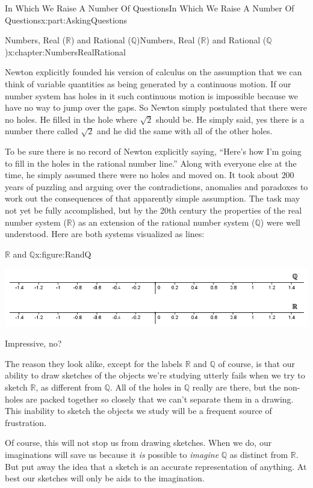 \documentclass[oneside,10pt,]{book}
\numberwithin{equation}{section}
\newcommand{\RR}{\mathbb {R}}
\newcommand{\QQ}{\mathbb {Q}}
\begin{document}
\begin{partptx}{In Which We Raise A Number Of Questions}{}{In Which We Raise A Number Of Questions}{}{}{x:part:AskingQuestions}
\begin{chapterptx}{Numbers, Real (\(\RR\)) and Rational (\(\QQ\))}{}{Numbers, Real (\(\RR\)) and Rational (\(\QQ\))}{}{}{x:chapter:NumbersRealRational}
\begin{introduction}{}
\par
Newton explicitly founded his version of calculus on the assumption that we can think of variable quantities as being generated by a continuous motion. If our number system has holes in it such continuous motion is impossible because we have no way to jump over the gaps. So Newton simply postulated that there were no holes. He filled in the hole where \(\sqrt{2}\) should be. He simply said, yes there is a number there called \(\sqrt{2}\) and he did the same with all of the other holes.%
\par
To be sure there is no record of Newton explicitly saying, ``Here's how I'm going to fill in the holes in the rational number line.'' Along with everyone else at the time, he simply assumed there were no holes and moved on. It took about \(200\) years of puzzling and arguing over the contradictions, anomalies and paradoxes to work out the consequences of that apparently simple assumption. The task may not yet be fully accomplished, but by the 20th century the properties of the real number system (\(\RR\)) as an extension of the rational number system (\(\QQ\)) were well understood. Here are both systems visualized as lines:%
\begin{figureptx}{\(\RR\) and \(\QQ\)}{x:figure:RandQ}{}%
\begin{image}{0}{1}{0}%
\includegraphics[width=\linewidth]{images/RandQ.png}
\end{image}%
\tcblower
\end{figureptx}%
Impressive, no?%
\par
The reason they look alike, except for the labels \(\RR\) and \(\QQ\) of course, is that our ability to draw sketches of the objects we're studying utterly fails when we try to sketch \(\RR\), as different from \(\QQ\). All of the holes in \(\QQ\) really are there, but the non-holes are packed together so closely that we can't separate them in a drawing. This inability to sketch the objects we study will be a frequent source of frustration.%
\par
Of course, this will not stop us from drawing sketches. When we do, our imaginations will save us because it \emph{is} possible to \emph{imagine} \(\QQ\) as distinct from \(\RR\). But put away the idea that a sketch is an accurate representation of anything. At best our sketches will only be aids to the imagination.%

\end{introduction}
\end{chapterptx}
\end{partptx}
\end{document}
